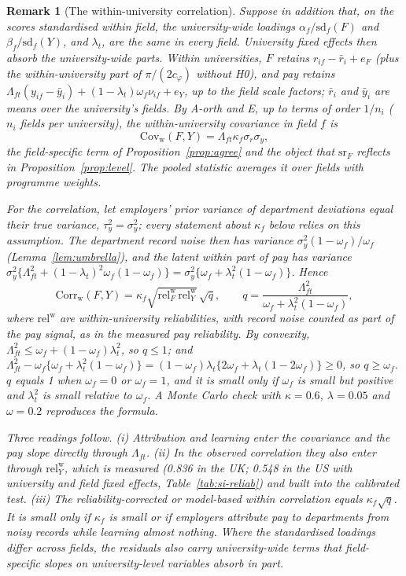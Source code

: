 \documentclass[11pt]{article}
\newtheorem{sremark}{Remark}
\begin{document}
\begin{sremark}[The within-university correlation]\label{rem:within}
Suppose in addition that, on the scores standardised within field, the university-wide loadings
$\alpha_f/\mathrm{sd}_f(F)$ and $\beta_f/\mathrm{sd}_f(Y)$, and $\lambda_t$, are the same in every field. University
fixed effects then absorb the university-wide parts. Within universities, $F$ retains $r_{if}-\bar r_i+e_F$ (plus the
within-university part of $\pi/(2c_\varphi)$ without H0), and pay retains
$\Lambda_{ft}(y_{if}-\bar y_i)+(1-\lambda_t)\omega_f\nu_{if}+e_Y$, up to the field scale factors; $\bar r_i$ and
$\bar y_i$ are means over the university's fields. By A-orth and E, up to terms of order $1/n_i$ ($n_i$ fields per
university), the within-university covariance in field $f$ is
\[
\mathrm{Cov}_{\mathrm{w}}(F,Y)=\Lambda_{ft}\kappa_f\sigma_r\sigma_y ,
\]
the field-specific term of Proposition~\ref{prop:agree} and the object that $\mathrm{sr}_F$ reflects in
Proposition~\ref{prop:level}. The pooled statistic averages it over fields with programme weights.

For the correlation, let employers' prior variance of department deviations equal their true variance,
$\tau_y^2=\sigma_y^2$; every statement about $\kappa_f$ below relies on this assumption. The department record noise then has variance $\sigma_y^2(1-\omega_f)/\omega_f$
(Lemma~\ref{lem:umbrella}), and the latent within part of pay has variance
$\sigma_y^2\{\Lambda_{ft}^2+(1-\lambda_t)^2\omega_f(1-\omega_f)\}=\sigma_y^2\{\omega_f+\lambda_t^2(1-\omega_f)\}$. Hence
\[
\mathrm{Corr}_{\mathrm{w}}(F,Y)=\kappa_f\sqrt{\mathrm{rel}^{\mathrm w}_F\,\mathrm{rel}^{\mathrm w}_Y}\,\sqrt{q},\qquad
q=\frac{\Lambda_{ft}^2}{\omega_f+\lambda_t^2(1-\omega_f)},
\]
where $\mathrm{rel}^{\mathrm w}$ are within-university reliabilities, with record noise counted as part of the pay
signal, as in the measured pay reliability. By convexity, $\Lambda_{ft}^2\le\omega_f+(1-\omega_f)\lambda_t^2$, so
$q\le1$; and $\Lambda_{ft}^2-\omega_f\{\omega_f+\lambda_t^2(1-\omega_f)\}=(1-\omega_f)\lambda_t\{2\omega_f+\lambda_t
(1-2\omega_f)\}\ge0$, so $q\ge\omega_f$. $q$ equals 1 when $\omega_f=0$ or $\omega_f=1$, and it is small only if
$\omega_f$ is small but positive and $\lambda_t^2$ is small relative to $\omega_f$. A Monte Carlo check with
$\kappa=0.6$, $\lambda=0.05$ and $\omega=0.2$ reproduces the formula.

Three readings follow. (i) Attribution and learning enter the covariance and the pay slope directly through
$\Lambda_{ft}$. (ii) In the observed correlation they also enter through $\mathrm{rel}^{\mathrm w}_Y$, which is measured
(0.836 in the UK; 0.548 in the US with university and field fixed effects, Table~\ref{tab:si-reliab}) and built into
the calibrated test. (iii) The reliability-corrected or model-based within correlation equals $\kappa_f\sqrt q$. It
is small only if $\kappa_f$ is small or if employers attribute pay to departments from noisy records while learning
almost nothing. Where the standardised loadings differ across fields, the residuals also carry university-wide terms
that field-specific slopes on university-level variables absorb in part.
\end{sremark}
\end{document}
